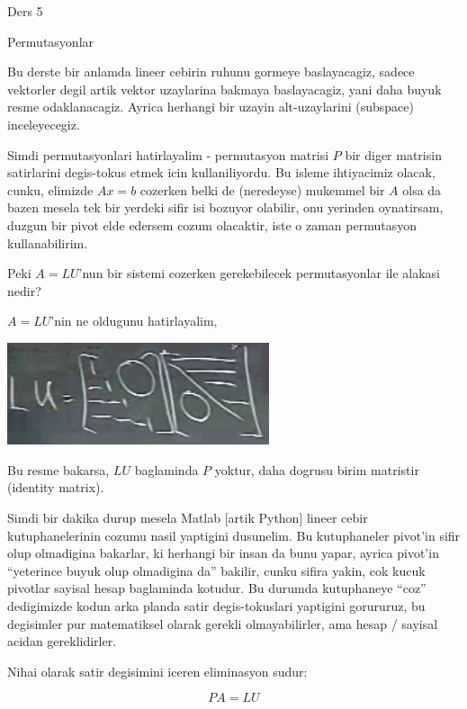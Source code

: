 \documentclass[12pt,fleqn]{article}\usepackage{../common}
\begin{document}
Ders 5

Permutasyonlar

Bu derste bir anlamda lineer cebirin ruhunu gormeye baslayacagiz, sadece
vektorler degil artik vektor uzaylarina bakmaya baslayacagiz, yani daha
buyuk resme odaklanacagiz. Ayrica herhangi bir uzayin alt-uzaylarini
(subspace) inceleyecegiz. 

Simdi permutasyonlari hatirlayalim - permutasyon matrisi $P$ bir diger
matrisin satirlarini degis-tokus etmek icin kullaniliyordu. Bu isleme
ihtiyacimiz olacak, cunku, elimizde $Ax=b$ cozerken belki de (neredeyse)
mukemmel bir $A$ olsa da bazen mesela tek bir yerdeki sifir isi bozuyor
olabilir, onu yerinden oynatirsam, duzgun bir pivot elde edersem cozum
olacaktir, iste o zaman permutasyon kullanabilirim.

Peki $A=LU$'nun bir sistemi cozerken gerekebilecek permutasyonlar ile
alakasi nedir?

$A=LU$'nin ne oldugunu hatirlayalim, 

\includegraphics[height=3cm]{5_01.png}

Bu resme bakarsa, $LU$ baglaminda $P$ yoktur, daha dogrusu birim matristir
(identity matrix). 

Simdi bir dakika durup mesela Matlab [artik Python] lineer cebir
kutuphanelerinin cozumu nasil yaptigini dusunelim. Bu kutuphaneler pivot'in
sifir olup olmadigina bakarlar, ki herhangi bir insan da bunu yapar, ayrica
pivot'in ``yeterince buyuk olup olmadigina da'' bakilir, cunku sifira
yakin, cok kucuk pivotlar sayisal hesap baglaminda kotudur. Bu durumda
kutuphaneye ``coz'' dedigimizde kodun arka planda satir degis-tokuslari
yaptigini gorururuz, bu degisimler pur matematiksel olarak gerekli
olmayabilirler, ama hesap / sayisal acidan gereklidirler. 

Nihai olarak satir degisimini iceren eliminasyon sudur:

$$ PA = LU $$
\end{document}

